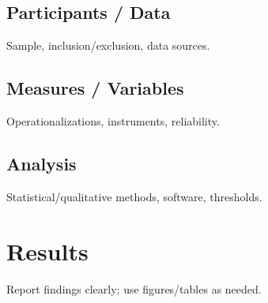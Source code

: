 \subsection{Participants / Data}
Sample, inclusion/exclusion, data sources.

\subsection{Measures / Variables}
Operationalizations, instruments, reliability.

\subsection{Analysis}
Statistical/qualitative methods, software, thresholds.


\section{Results}
Report findings clearly; use figures/tables as needed.


